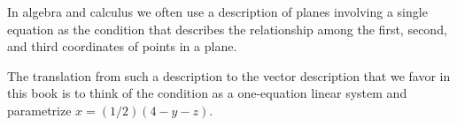 In algebra and calculus we often use a description of planes involving 
a single equation
as the condition that describes 
the relationship among the first, second, and third
coordinates of points in a plane.
\newsavebox{\jhscratchbox}
\savebox{\jhscratchbox}{\texttt{[image: ch1.18]}}
\newlength{\jhscratchlength}\newlength{\jhscratchheight}
\settowidth{\jhscratchlength}{\usebox{\jhscratchbox}}
\begin{center}
  \usebox{\jhscratchbox}
\end{center}
The translation from such a description to the vector description that we
favor in this book is to 
think of the condition as a one-equation linear system
and parametrize \( x=(1/2)(4-y-z) \).
\begin{center}
  \makebox[\jhscratchlength][l]{\texttt{[image: ch1.20]}}
\end{center}

